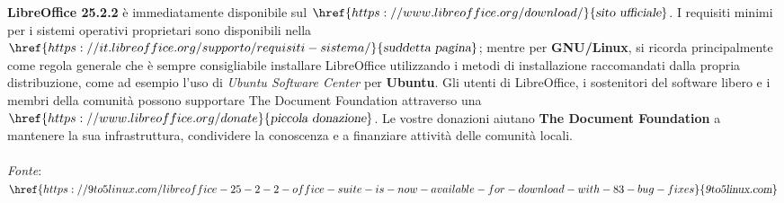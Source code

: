 \documentclass[a4paper,twoside]{article}
\begin{document}
\textbf{LibreOffice 25.2.2} è immediatamente disponibile sul $\href{https://www.libreoffice.org/download/}{\textsl{sito ufficiale}}$. I requisiti minimi per i sistemi operativi proprietari sono disponibili nella $\href{https://it.libreoffice.org/supporto/requisiti-sistema/}{\textsl{suddetta pagina}}$; mentre per \textbf{GNU/Linux}, si ricorda principalmente come regola generale che è sempre consigliabile installare LibreOffice utilizzando i metodi di installazione raccomandati dalla propria distribuzione, come ad esempio l'uso di \textit{Ubuntu Software Center} per \textbf{Ubuntu}. Gli utenti di LibreOffice, i sostenitori del software libero e i membri della comunità possono supportare The Document Foundation attraverso una $\href{https://www.libreoffice.org/donate}{\textsl{piccola donazione}}$. Le vostre donazioni aiutano \textbf{The Document Foundation} a mantenere la sua infrastruttura, condividere la conoscenza e a finanziare attività delle comunità locali.\\
\\
\textit{Fonte}:\\
$\href{https://9to5linux.com/libreoffice-25-2-2-office-suite-is-now-available-for-download-with-83-bug-fixes}{\textsl{9to5linux.com}}$
\end{document}
